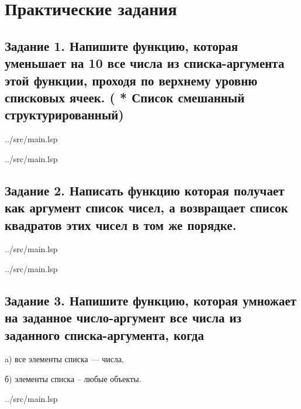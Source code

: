 \chapter{Практические задания}

\section*{Задание 1. Напишите функцию, которая уменьшает на 10 все числа из списка-аргумента этой функции, проходя по верхнему уровню списковых ячеек. ( * Список смешанный структурированный)}

\begin{lstinputlisting}[
	caption={Задание 1, mapcar},
	label={lst:t1-1},
	style={lsp},
	linerange={1-7},
	]{../src/main.lsp}
\end{lstinputlisting}

\begin{lstinputlisting}[
	caption={Задание 1, mapcan},
	label={lst:t1-2},
	style={lsp},
	linerange={10-18},
	]{../src/main.lsp}
\end{lstinputlisting}

\section*{Задание 2. Написать функцию которая получает как аргумент список чисел, а возвращает список квадратов этих чисел в том же порядке.}

\begin{lstinputlisting}[
	caption={Задание 2, mapcar},
	label={lst:t2-1},
	style={lsp},
	linerange={20-24},
	]{../src/main.lsp}
\end{lstinputlisting}

\begin{lstinputlisting}[
	caption={Задание 2, mapcan},
	label={lst:t2-2},
	style={lsp},
	linerange={26-30},
	]{../src/main.lsp}
\end{lstinputlisting}

\section*{Задание 3.  Напишите функцию, которая умножает на заданное число-аргумент все числа из заданного списка-аргумента, когда}
a) все элементы списка --- числа,

б) элементы списка -- любые объекты.

\begin{lstinputlisting}[
	caption={Задание 3, a, mapcar, mapcon},
	label={lst:t3-1},
	style={lsp},
	linerange={32-42},
	]{../src/main.lsp}
\end{lstinputlisting}

